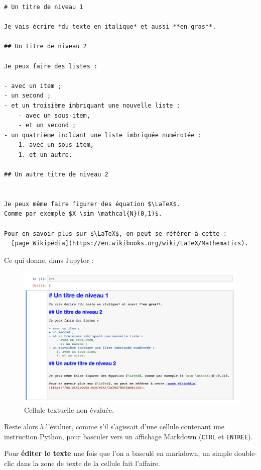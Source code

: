\documentclass[12pt,]{book}
\numberwithin{equation}{section}
\numberwithin{countremarque}{section}
\begin{document}
\begin{lstlisting}
# Un titre de niveau 1

Je vais écrire *du texte en italique* et aussi **en gras**.

## Un titre de niveau 2

Je peux faire des listes :

- avec un item ;
- un second ;
- et un troisième imbriquant une nouvelle liste :
    - avec un sous-item,
    - et un second ;
- un quatrième incluant une liste imbriquée numérotée :
    1. avec un sous-item,
    1. et un autre.

## Un autre titre de niveau 2


Je peux même faire figurer des équation $\LaTeX$.
Comme par exemple $X \sim \mathcal{N}(0,1)$.

Pour en savoir plus sur $\LaTeX$, on peut se référer à cette :
  [page Wikipédia](https://en.wikibooks.org/wiki/LaTeX/Mathematics).
\end{lstlisting}

Ce qui donne, dans Jupyter :

\begin{figure}[h]

{\centering \includegraphics[width=1\linewidth]{figs/jupyter_notebook_3} 

}

\caption{Cellule textuelle non évaluée.}\label{fig:unnamed-chunk-10}
\end{figure}

Reste alors à l'évaluer, comme s'il s'agissait d'une cellule contenant
une instruction Python, pour basculer vers un affichage Markdown
(\texttt{CTRL} et \texttt{ENTREE}).

Pour \textbf{éditer le texte} une fois que l'on a basculé en markdown,
un simple double-clic dans la zone de texte de la cellule fait
l'affaire.
\end{document}

